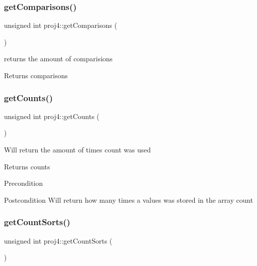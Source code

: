 \subsubsection{\texorpdfstring{get\+Comparisons()}{getComparisons()}}
{\footnotesize\ttfamily unsigned int proj4\+::get\+Comparisons (\begin{DoxyParamCaption}{ }\end{DoxyParamCaption})}



returns the amount of comparisions 

\begin{DoxyReturn}{Returns}
comparisons 
\end{DoxyReturn}
\mbox{\label{classproj4_ac80a9cc8bf6fdd000a6515fd63070371}} 
\subsubsection{\texorpdfstring{get\+Counts()}{getCounts()}}
{\footnotesize\ttfamily unsigned int proj4\+::get\+Counts (\begin{DoxyParamCaption}{ }\end{DoxyParamCaption})}

Will return the amount of times count was used \begin{DoxyReturn}{Returns}
counts 
\end{DoxyReturn}
\begin{DoxyPrecond}{Precondition}

\end{DoxyPrecond}
\begin{DoxyPostcond}{Postcondition}
Will return how many times a values was stored in the array count 
\end{DoxyPostcond}
\mbox{\label{classproj4_a8780450f397cf30384a2eb41d3a24df7}} 
\subsubsection{\texorpdfstring{get\+Count\+Sorts()}{getCountSorts()}}
{\footnotesize\ttfamily unsigned int proj4\+::get\+Count\+Sorts (\begin{DoxyParamCaption}{ }\end{DoxyParamCaption})}

